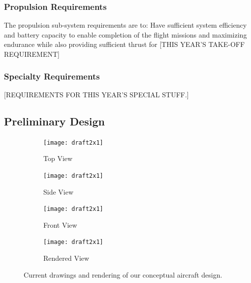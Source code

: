 \documentclass[proposal]{byu-aero}
\begin{document}
\subsubsection{Propulsion Requirements}
\label{sssec:PropulsionReqs}

The propulsion sub-system requirements are to: Have sufficient system efficiency and battery capacity to enable completion of the flight missions and maximizing endurance while also providing sufficient thrust for {\color{BYUred}[THIS YEAR'S TAKE-OFF REQUIREMENT]}

\subsubsection{Specialty Requirements} %
\label{sssec:SpecialReqs}

{\color{BYUred}[REQUIREMENTS FOR THIS YEAR'S SPECIAL STUFF.]}



\subsection{Preliminary Design}
\label{ssec:PreliminaryDesign}

\begin{figure}[h!]
	\centering
	\begin{subfigure}[b]{0.475\textwidth}
		\texttt{[image: draft2x1]}
		\caption{Top View}
		\label{fig:topview}
	\end{subfigure}
	\begin{subfigure}[b]{0.475\textwidth}
		\texttt{[image: draft2x1]}
		\caption{Side View}
		\label{fig:sideview}
	\end{subfigure}

	\begin{subfigure}[b]{0.475\textwidth}
		\texttt{[image: draft2x1]}
		\caption{Front View}
		\label{fig:frontview}
	\end{subfigure}
	\begin{subfigure}[b]{0.475\textwidth}
		\texttt{[image: draft2x1]}
		\caption{Rendered View}
		\label{fig:renderedview}
	\end{subfigure}
	\caption{Current drawings and rendering of our conceptual aircraft design.}
	\label{fig:prelimdrawings}
\end{figure}
\end{document}
